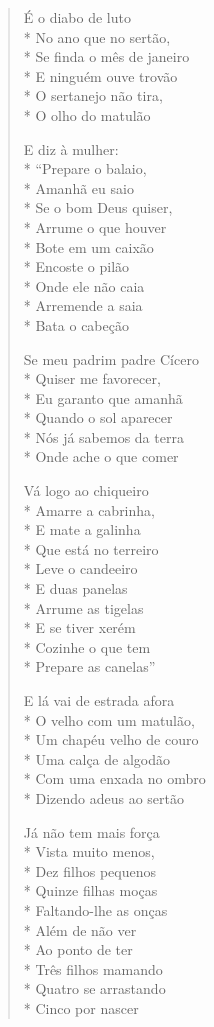 \begin{verse}

É o diabo de luto\\*
No ano que no sertão,\\*
Se finda o mês de janeiro\\*
E ninguém ouve trovão\\*
O sertanejo não tira,\\*
O olho do matulão

E diz à mulher:\\*
``Prepare o balaio,\\*
Amanhã eu saio\\*
Se o bom Deus quiser,\\*
Arrume o que houver\\*
Bote em um caixão\\*
Encoste o pilão\\*
Onde ele não caia\\*
Arremende a saia\\*
Bata o cabeção

Se meu padrim padre Cícero\\*
Quiser me favorecer,\\*
Eu garanto que amanhã\\*
Quando o sol aparecer\\*
Nós já sabemos da terra\\*
Onde ache o que comer

Vá logo ao chiqueiro\\*
Amarre a cabrinha,\\*
E mate a galinha\\*
Que está no terreiro\\*
Leve o candeeiro\\*
E duas panelas\\*
Arrume as tigelas\\*
E se tiver xerém\\*
Cozinhe o que tem\\*
Prepare as canelas''

E lá vai de estrada afora\\*
O velho com um matulão,\\*
Um chapéu velho de couro\\*
Uma calça de algodão\\*
Com uma enxada no ombro\\*
Dizendo adeus ao sertão

Já não tem mais força\\*
Vista muito menos,\\*
Dez filhos pequenos\\*
Quinze filhas moças\\*
Faltando-lhe as onças\\*
Além de não ver\\*
Ao ponto de ter\\*
Três filhos mamando\\*
Quatro se arrastando\\*
Cinco por nascer


\end{verse}
